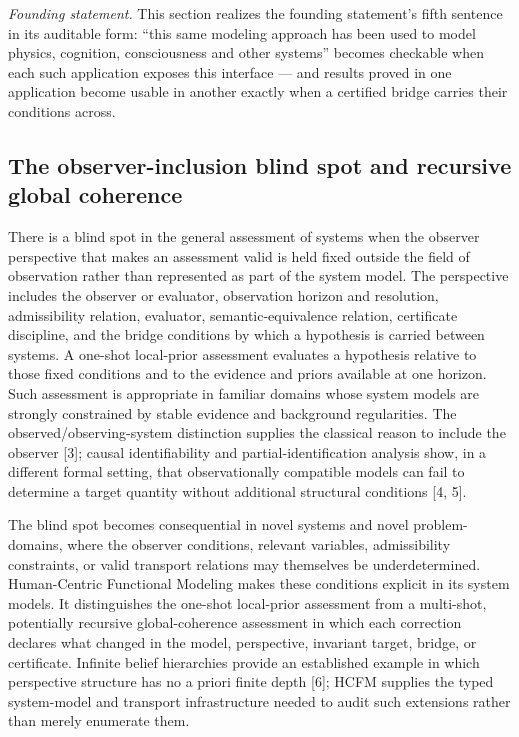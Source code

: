 \documentclass[11pt]{article}
\theoremstyle{definition}
\newcommand{\founding}{\emph{Founding statement.}}
\begin{document}
\noindent\founding{} This section realizes the founding statement's fifth sentence in its auditable form: ``this same modeling approach has been used to model physics, cognition, consciousness and other systems'' becomes checkable when each such application exposes this interface --- and results proved in one application become usable in another exactly when a certified bridge carries their conditions across.

\subsection{The observer-inclusion blind spot and recursive global coherence}

There is a blind spot in the general assessment of systems when the observer perspective that makes an assessment valid is held fixed outside the field of observation rather than represented as part of the system model. The perspective includes the observer or evaluator, observation horizon and resolution, admissibility relation, evaluator, semantic-equivalence relation, certificate discipline, and the bridge conditions by which a hypothesis is carried between systems. A one-shot local-prior assessment evaluates a hypothesis relative to those fixed conditions and to the evidence and priors available at one horizon. Such assessment is appropriate in familiar domains whose system models are strongly constrained by stable evidence and background regularities. The observed/observing-system distinction supplies the classical reason to include the observer [3]; causal identifiability and partial-identification analysis show, in a different formal setting, that observationally compatible models can fail to determine a target quantity without additional structural conditions [4, 5].

The blind spot becomes consequential in novel systems and novel problem-domains, where the observer conditions, relevant variables, admissibility constraints, or valid transport relations may themselves be underdetermined. Human-Centric Functional Modeling makes these conditions explicit in its system models. It distinguishes the one-shot local-prior assessment from a multi-shot, potentially recursive global-coherence assessment in which each correction declares what changed in the model, perspective, invariant target, bridge, or certificate. Infinite belief hierarchies provide an established example in which perspective structure has no a priori finite depth [6]; HCFM supplies the typed system-model and transport infrastructure needed to audit such extensions rather than merely enumerate them.
\end{document}

